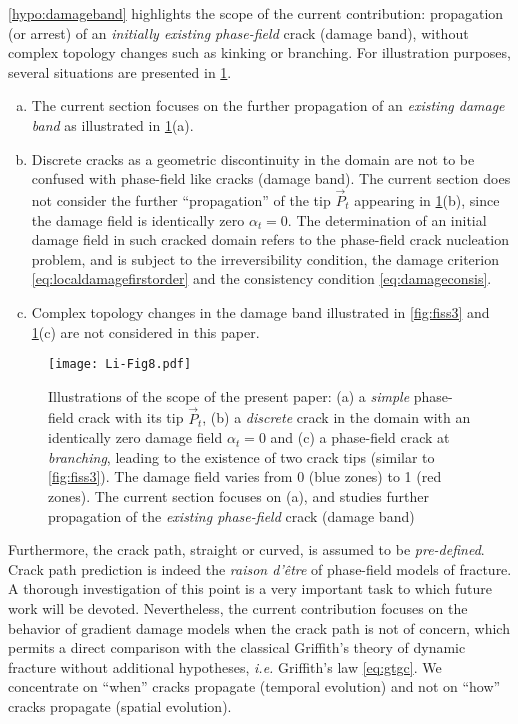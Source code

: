 \begin{remark}
\cref{hypo:damageband} highlights the scope of the current contribution: propagation (or arrest) of an \emph{initially existing phase-field} crack (damage band), without complex topology changes such as kinking or branching. For illustration purposes, several situations are presented in \cref{fig:examples}.
\begin{enumerate}[(a)]
\item The current section focuses on the further propagation of an \emph{existing damage band} as illustrated in \cref{fig:examples}(a).

\item Discrete cracks as a geometric discontinuity in the domain are not to be confused with phase-field like cracks (damage band). The current section does not consider the further ``propagation'' of the tip $\vec{P}_t$ appearing in \cref{fig:examples}(b), since the damage field is identically zero $\alpha_t=0$. The determination of an initial damage field in such cracked domain refers to the phase-field crack nucleation problem, and is subject to the irreversibility condition, the damage criterion \eqref{eq:localdamagefirstorder} and the consistency condition \eqref{eq:damageconsis}.

\item Complex topology changes in the damage band illustrated in \cref{fig:fiss3} and \cref{fig:examples}(c) are not considered in this paper.
\end{enumerate}

\begin{figure}[htbp]
\centering
\texttt{[image: Li-Fig8.pdf]}
\caption{Illustrations of the scope of the present paper: (a) a \emph{simple} phase-field crack with its tip $\vec{P}_t$, (b) a \emph{discrete} crack in the domain with an identically zero damage field $\alpha_t=0$ and (c) a phase-field crack at \emph{branching}, leading to the existence of two crack tips (similar to \cref{fig:fiss3}). The damage field varies from 0 (blue zones) to 1 (red zones). The current section focuses on (a), and studies further propagation of the \emph{existing phase-field} crack (damage band)} \label{fig:examples}
\end{figure}

Furthermore, the crack path, straight or curved, is assumed to be \emph{pre-defined}. Crack path prediction is indeed the \emph{raison d'être} of phase-field models of fracture. A thorough investigation of this point is a very important task to which future work will be devoted. Nevertheless, the current contribution focuses on the behavior of gradient damage models when the crack path is not of concern, which permits a direct comparison with the classical Griffith's theory of dynamic fracture without additional hypotheses, \emph{i.e.} Griffith's law \eqref{eq:gtgc}. We concentrate on ``when'' cracks propagate (temporal evolution) and not on ``how'' cracks propagate (spatial evolution).
\end{remark}

